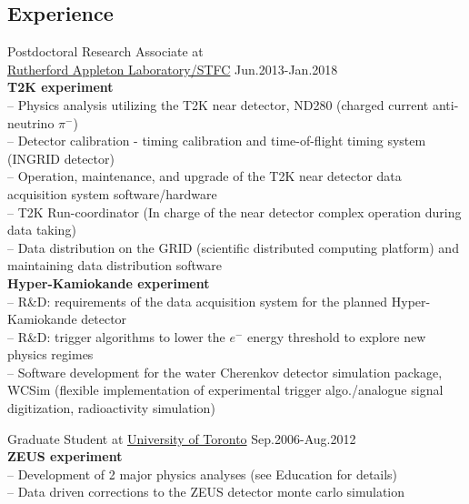 \documentclass[margin,line]{resume}
\begin{document}
\begin{resume}
    \section{\mysidestyle Experience}

    \begin{list2}

    \item Postdoctoral Research Associate at \\\href{https://www.stfc.ac.uk/index.cfm}{Rutherford Appleton Laboratory/STFC} \hfill{Jun.2013-Jan.2018}\\
      \textbf{T2K experiment}\\
      -- Physics analysis utilizing the T2K near detector, ND280 (charged current anti-neutrino $\pi^{-}$)\\
      -- Detector calibration - timing calibration and time-of-flight timing system (INGRID detector)\\
      -- Operation, maintenance, and upgrade of the T2K near detector data acquisition system software/hardware\\
      -- T2K Run-coordinator (In charge of the near detector complex operation during data taking)\\
      -- Data distribution on the GRID (scientific distributed computing platform) and maintaining data distribution software\\
      \textbf{Hyper-Kamiokande experiment}\\
      -- R\&D: requirements of the data acquisition system for the planned Hyper-Kamiokande detector\\
      -- R\&D: trigger algorithms to lower the $e^{-}$ energy threshold to explore new physics regimes\\
      -- Software development for the water Cherenkov detector simulation package, WCSim (flexible implementation of experimental trigger algo./analogue signal digitization, radioactivity simulation)
    \item Graduate Student at \href{https://www.physics.utoronto.ca/}{University of Toronto} \hfill{Sep.2006-Aug.2012}\\
      \textbf{ZEUS experiment}\\
      -- Development of 2 major physics analyses (see Education for details)\\
      -- Data driven corrections to the ZEUS detector monte carlo simulation\\

\end{list2}
\end{resume}
\end{document}
